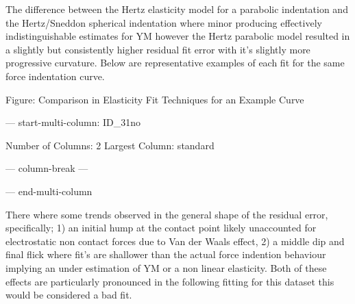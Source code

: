 \documentclass[
  paper=a4,
  ,captions=tableheading
]{scrartcl}
\makeatletter
\newenvironment{Shaded}{}{}
\newcommand{\NormalTok}[1]{#1}
\newcommand*\pandocbounded[1]{%
  \sbox\pandoc@box{#1}%
  \Gscale@div\@tempa{\textheight}{\dimexpr\ht\pandoc@box+\dp\pandoc@box\relax}%
  \Gscale@div\@tempb{\linewidth}{\wd\pandoc@box}%
  \ifdim\@tempb\p@<\@tempa\p@\let\@tempa\@tempb\fi%
  \ifdim\@tempa\p@<\p@\scalebox{\@tempa}{\usebox\pandoc@box}%
  \else\usebox{\pandoc@box}%
  \fi%
}
\makeatother
\begin{document}
The difference between the Hertz elasticity model for a parabolic
indentation and the Hertz/Sneddon spherical indentation where minor
producing effectively indistinguishable estimates for YM however the
Hertz parabolic model resulted in a slightly but consistently higher
residual fit error with it's slightly more progressive curvature. Below
are representative examples of each fit for the same force indentation
curve.

Figure: Comparison in Elasticity Fit Techniques for an Example Curve

--- start-multi-column: ID\_31no

\begin{Shaded}
\begin{Highlighting}[]
\NormalTok{Number of Columns: 2}
\NormalTok{Largest Column: standard}
\end{Highlighting}
\end{Shaded}

\pandocbounded{}

--- column-break ---

\pandocbounded{}

--- end-multi-column

There where some trends observed in the general shape of the residual
error, specifically; 1) an initial hump at the contact point likely
unaccounted for electrostatic non contact forces due to Van der Waals
effect, 2) a middle dip and final flick where fit's are shallower than
the actual force indention behaviour implying an under estimation of YM
or a non linear elasticity. Both of these effects are particularly
pronounced in the following fitting for this dataset this would be
considered a bad fit.

\pandocbounded{}

\pandocbounded{}
\end{document}
